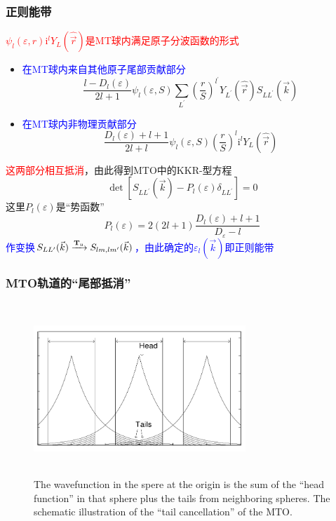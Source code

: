 \documentclass[cjk,slidestop,compress,mathserif,blue]{beamer}
\begin{document}
\frame
{
	\frametitle{正则能带}
	\textcolor{red}{$\psi_l(\varepsilon,r)\mathrm{i}^lY_L(\hat{\vec r})$是\textrm{MT}球内满足原子分波函数的形式}
	\begin{itemize}
		\item \textcolor{blue}{在\textrm{MT}球内来自其他原子尾部贡献部分}$$\dfrac{l-D_l(\varepsilon)}{2l+1}\psi_l(\varepsilon,S)\sum_{L^{\prime}}\left(\dfrac rS\right)^{l^{\prime}}Y_{L^{\prime}}(\hat{\vec r})S_{LL^{\prime}}(\vec k)$$
		\item \textcolor{blue}{在\textrm{MT}球内非物理贡献部分}$$\dfrac{D_l(\varepsilon)+l+1}{2l+l}\psi_l(\varepsilon,S)\left(\dfrac rS\right)^l\mathrm{i}^lY_L(\hat{\vec r})$$
	\end{itemize}
	\textcolor{red}{这两部分相互抵消}，由此得到\textrm{MTO}中的\textrm{KKR}-型方程
	\begin{displaymath}
		\det[S_{LL^{\prime}}(\vec k)-P_l(\varepsilon)\delta_{LL^{\prime}}]=0
	\end{displaymath}
	这里$P_l(\varepsilon)$是“势函数”
	\begin{displaymath}
		P_l(\varepsilon)=2(2l+1)\dfrac{D_l(\varepsilon)+l+1}{D_{\varepsilon}-l}
	\end{displaymath}
	\textcolor{blue}{作变换$S_{LL^{\prime}}(\vec k)\xrightarrow{\bf{T}\rm{_u}}S_{lm,lm^{\prime}}(\vec k)$，由此确定的$\varepsilon_l(\vec k)$即正则能带}
}

\frame
{
	\frametitle{\textrm{MTO}轨道的“尾部抵消”}
\begin{figure}[h!]
	\vspace*{-0.7in}
\centering
\includegraphics[height=2.55in,width=3.15in,viewport=0 0 845 635,clip]{Figures/MTO-Tail_cancellation.png}
\caption{\small \textrm{The wavefunction in the spere at the origin is the sum of the ``head function'' in that sphere plus the tails from neighboring spheres. The schematic illustration of the ``tail cancellation'' of the MTO.}}%
\label{MTO-tail-candellation}
\end{figure}
}
\end{document}
